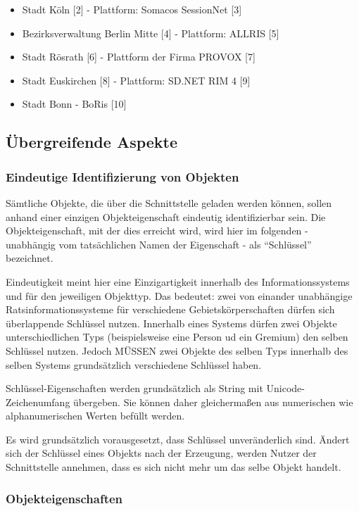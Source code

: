 \documentclass[,a4paper]{article}
\begin{document}
\begin{itemize}
\item
  Stadt Köln {[}2{]} - Plattform: Somacos SessionNet {[}3{]}
\item
  Bezirksverwaltung Berlin Mitte {[}4{]} - Plattform: ALLRIS {[}5{]}
\item
  Stadt Rösrath {[}6{]} - Plattform der Firma PROVOX {[}7{]}
\item
  Stadt Euskirchen {[}8{]} - Plattform: SD.NET RIM 4 {[}9{]}
\item
  Stadt Bonn - BoRis {[}10{]}
\end{itemize}

\subsection{Übergreifende Aspekte}

\subsubsection{Eindeutige Identifizierung von Objekten}

Sämtliche Objekte, die über die Schnittstelle geladen werden können,
sollen anhand einer einzigen Objekteigenschaft eindeutig identifizierbar
sein. Die Objekteigenschaft, mit der dies erreicht wird, wird hier im
folgenden - unabhängig vom tatsächlichen Namen der Eigenschaft - als
``Schlüssel'' bezeichnet.

Eindeutigkeit meint hier eine Einzigartigkeit innerhalb des
Informationssystems und für den jeweiligen Objekttyp. Das bedeutet: zwei
von einander unabhängige Ratsinformationssysteme für verschiedene
Gebietskörperschaften dürfen sich überlappende Schlüssel nutzen.
Innerhalb eines Systems dürfen zwei Objekte unterschiedlichen Typs
(beispielsweise eine Person ud ein Gremium) den selben Schlüssel nutzen.
Jedoch MÜSSEN zwei Objekte des selben Typs innerhalb des selben Systems
grundsätzlich verschiedene Schlüssel haben.

Schlüssel-Eigenschaften werden grundsätzlich als String mit
Unicode-Zeichenumfang übergeben. Sie können daher gleichermaßen aus
numerischen wie alphanumerischen Werten befüllt werden.

Es wird grundsätzlich vorausgesetzt, dass Schlüssel unveränderlich sind.
Ändert sich der Schlüssel eines Objekts nach der Erzeugung, werden
Nutzer der Schnittstelle annehmen, dass es sich nicht mehr um das selbe
Objekt handelt.

\subsubsection{Objekteigenschaften}
\end{document}
